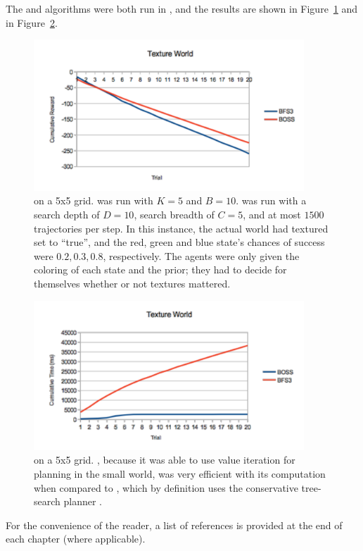 The  and  algorithms were both run in , and the results are shown in Figure~\ref{sec:expr:tworld-reward} and in Figure~\ref{sec:expr:tworld-time}.


\begin{figure}
\vskip 0.2in
\begin{center}
\centerline{\includegraphics[width=4in]{figures/tworld-reward}}
\caption{
 on a 5x5 grid.  was run with $K=5$ and $B=10$.  was run with a search depth of $D=10$, search breadth of $C=5$, and at most $1500$ trajectories per step. In this instance, the actual world had textured set to ``true'', and the red, green and blue state's chances of success were $0.2, 0.3, 0.8$, respectively. The agents were only given the coloring of each state and the prior; they had to decide for themselves whether or not textures mattered.
}
\label{sec:expr:tworld-reward}
\end{center}
\vskip -0.2in
\end{figure} 


\begin{figure}
\vskip 0.2in
\begin{center}
\centerline{\includegraphics[width=4in]{figures/tworld-time}}
\caption{
 on a 5x5 grid. , because it was able to use value iteration for planning in the small world, was very efficient with its computation when compared to , which by definition uses the conservative tree-search planner .
}
\label{sec:expr:tworld-time}
\end{center}
\vskip -0.2in
\end{figure} 

%
\ifperchapterbib%
For the convenience of the reader, a list of references is provided at the end of each chapter (where applicable).
\ifendbib%
\else\fi%
\else\fi%
